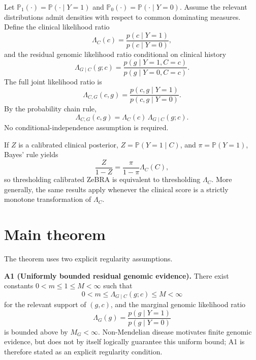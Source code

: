 \documentclass[journal]{IEEEtran}
\newcommand{\Pone}{\mathbb{P}_1}
\newcommand{\Pzero}{\mathbb{P}_0}
\newcommand{\LR}{\Lambda}
\begin{document}
Let $\Pone(\cdot)=\mathbb{P}(\cdot\mid Y=1)$ and $\Pzero(\cdot)=\mathbb{P}(\cdot\mid Y=0)$. Assume the relevant distributions admit densities with respect to common dominating measures. Define the clinical likelihood ratio
\begin{equation}
\LR_C(c)=\frac{p(c\mid Y=1)}{p(c\mid Y=0)},
\label{eq:clinicalLR}
\end{equation}
and the residual genomic likelihood ratio conditional on clinical history
\begin{equation}
\LR_{G\mid C}(g;c)
=\frac{p(g\mid Y=1,C=c)}{p(g\mid Y=0,C=c)}.
\label{eq:conditionalGLR}
\end{equation}
The full joint likelihood ratio is
\begin{equation}
\LR_{C,G}(c,g)
=\frac{p(c,g\mid Y=1)}{p(c,g\mid Y=0)}.
\end{equation}
By the probability chain rule,
\begin{equation}
\boxed{
\LR_{C,G}(c,g)
=\LR_C(c)\,\LR_{G\mid C}(g;c).
}
\label{eq:factorization}
\end{equation}
No conditional-independence assumption is required.

If $Z$ is a calibrated clinical posterior, $Z=\mathbb{P}(Y=1\mid C)$, and $\pi=\mathbb{P}(Y=1)$, Bayes' rule yields
\begin{equation}
\frac{Z}{1-Z}
=\frac{\pi}{1-\pi}\LR_C(C),
\label{eq:zlr}
\end{equation}
so thresholding calibrated ZeBRA is equivalent to thresholding $\LR_C$. More generally, the same results apply whenever the clinical score is a strictly monotone transformation of $\LR_C$.

\section{Main theorem}

The theorem uses two explicit regularity assumptions.

\textbf{A1 (Uniformly bounded residual genomic evidence).} There exist constants $0<m\le 1\le M<\infty$ such that
\begin{equation}
0<m\le \LR_{G\mid C}(g;c)\le M<\infty
\label{eq:boundedconditional}
\end{equation}
for the relevant support of $(g,c)$, and the marginal genomic likelihood ratio
\begin{equation}
\LR_G(g)=\frac{p(g\mid Y=1)}{p(g\mid Y=0)}
\end{equation}
is bounded above by $M_G<\infty$. Non-Mendelian disease motivates finite genomic evidence, but does not by itself logically guarantee this uniform bound; A1 is therefore stated as an explicit regularity condition.
\end{document}
